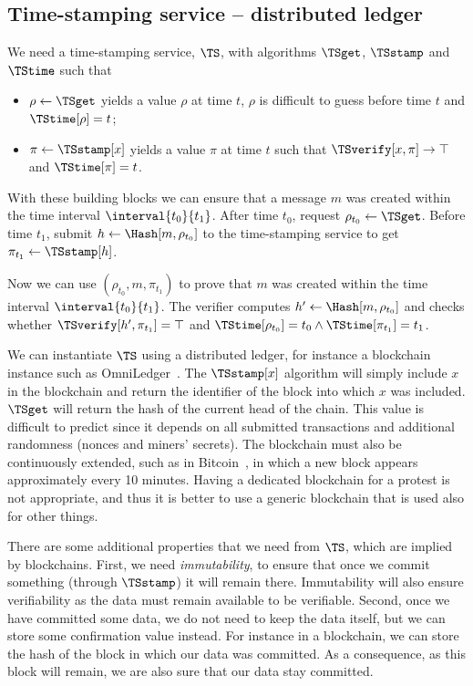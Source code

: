 \subsection{Time-stamping service -- distributed ledger}%
\label{StorageProperties}

We need a time-stamping service, \(\TS\), with algorithms \(\TSget\), 
\(\TSstamp\) and \(\TStime\) such that
\begin{itemize}
  \item \(\rho \gets \TSget\) yields a value \(\rho\) at time \(t\), \(\rho\) is difficult to guess before time \(t\) and \(\TStime[\rho] = t\);
  \item \(\pi\gets \TSstamp[x]\) yields a value \(\pi\) at time \(t\) such that 
    \(\TSverify[x, \pi]\to \top\) and \(\TStime[\pi] = t\).
\end{itemize}

With these building blocks we can ensure that a message \(m\) was created within the time interval \(\interval{t_0}{t_1}\).
After time \(t_0\), request \(\rho_{t_0}\gets \TSget\).
Before time \(t_1\), submit \(h\gets \Hash[m, \rho_{t_0}]\) to the time-stamping service to get \(\pi_{t_1}\gets \TSstamp[h]\).

Now we can use \((\rho_{t_0}, m, \pi_{t_1})\) to prove that \(m\) was created within the time interval \(\interval{t_0}{t_1}\).
The verifier computes \(h'\gets \Hash[m, \rho_{t_0}]\) and checks whether 
\(\TSverify[h', \pi_{t_1}] = \top\) and \(\TStime[\rho_{t_0}] = t_0\land 
  \TStime[\pi_{t_1}] = t_1\).

We can instantiate \(\TS\) using a distributed ledger, for instance a blockchain instance such as OmniLedger~\cite{OmniLedger}.
The \(\TSstamp[x]\) algorithm will simply include \(x\) in the blockchain and return the identifier of the block into which \(x\) was included.
\(\TSget\) will return the hash of the current head of the chain.
This value is difficult to predict since it depends on all submitted transactions and additional randomness (\eg nonces and miners' secrets).
The blockchain must also be continuously extended, such as in Bitcoin~\cite{Bitcoin}, in which a new block appears approximately every 10 minutes.
Having a dedicated blockchain for a protest is not appropriate, and thus it is better to use a generic blockchain that is used also for other things.

There are some additional properties that we need from \(\TS\), which are implied by blockchains.
First, we need \emph{immutability}, to ensure that once we commit something (through \(\TSstamp\)) it will remain there.
Immutability will also ensure verifiability as the data must remain available to be verifiable.
Second, once we have committed some data, we do not need to keep the data itself, but we can store some confirmation value instead.
For instance in a blockchain, we can store the hash of the block in which our data was committed.
As a consequence, as this block will remain, we are also sure that our data stay committed.

